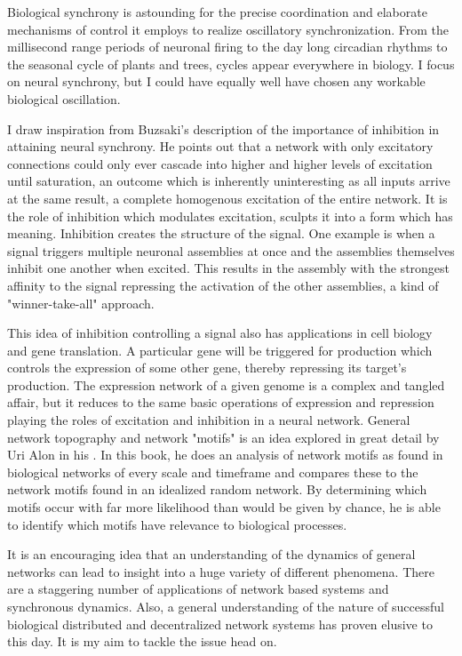 \documentclass[12pt]{article}
\begin{document}
Biological synchrony is astounding for the precise coordination and elaborate mechanisms of control it employs to realize oscillatory synchronization.  From the millisecond range periods of neuronal firing to the day long circadian rhythms to the seasonal cycle of plants and trees, cycles appear everywhere in biology.  I focus on neural synchrony, but I could have equally well have chosen any workable biological oscillation.  

I draw inspiration from Buzsaki's description of the importance of inhibition in attaining neural synchrony.  He points out that a network with only excitatory connections could only ever cascade into higher and higher levels of excitation until saturation,  an outcome which is inherently uninteresting as all inputs arrive at the same result, a complete homogenous excitation of the entire network.  It is the role of inhibition which modulates excitation, sculpts it into a form which has meaning.  Inhibition creates the structure of the signal.  One example is when a signal triggers multiple neuronal assemblies at once and the assemblies themselves inhibit one another when excited.  This results in the assembly with the strongest affinity to the signal repressing the activation of the other assemblies, a kind of "winner-take-all" approach.  

This idea of inhibition controlling a signal also has applications in cell biology and gene translation.  A particular gene will be triggered for production which controls the expression of some other gene, thereby repressing its target's production.  The expression network of a given genome is a complex and tangled affair, but it reduces to the same basic operations of expression and repression playing the roles of excitation and inhibition in a neural network.  General network topography and network "motifs" is an idea explored in great detail by Uri Alon in his \cite{Alon}.  In this book, he does an analysis of network motifs as found in biological networks of every scale and timeframe and compares these to the network motifs found in an idealized random network.  By determining which motifs occur with far more likelihood than would be given by chance, he is able to identify which motifs have relevance to biological processes.  

It is an encouraging idea that an understanding of the dynamics of general networks can lead to insight into a huge variety of different phenomena.  There are a staggering number of applications of network based systems and synchronous dynamics.  Also, a general understanding of the nature of successful biological distributed and decentralized network systems has proven elusive to this day.  It is my aim to tackle the issue head on.
\end{document}
